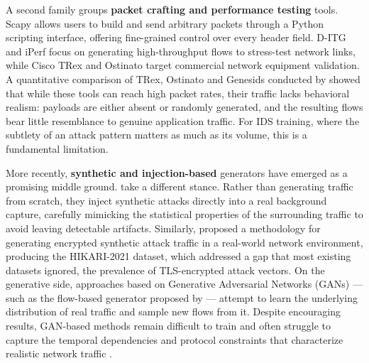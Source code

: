\documentclass[conference]{IEEEtran}
\begin{document}
A second family groups \textbf{packet crafting and performance testing}
tools. Scapy allows users to build and send arbitrary packets through
a Python scripting interface, offering fine-grained control over every
header field. D-ITG and iPerf focus on generating high-throughput flows
to stress-test network links, while Cisco TRex and Ostinato target
commercial network equipment validation. A quantitative comparison of
TRex, Ostinato and Genesids conducted by \textcite{koay2021} showed
that while these tools can reach high packet rates, their traffic lacks
behavioral realism: payloads are either absent or randomly generated,
and the resulting flows bear little resemblance to genuine application
traffic. For IDS training, where the subtlety of an attack pattern
matters as much as its volume, this is a fundamental limitation.

More recently, \textbf{synthetic and injection-based} generators have
emerged as a promising middle ground. \textcite{id2t2021} take a
different stance. Rather than generating traffic from scratch, they
inject synthetic attacks directly into a real background capture,
carefully mimicking the statistical properties of the surrounding
traffic to avoid leaving detectable artifacts. Similarly,
\textcite{hikari2021} proposed a methodology for generating encrypted
synthetic attack traffic in a real-world network environment, producing
the HIKARI-2021 dataset, which addressed a gap that most existing
datasets ignored, the prevalence of TLS-encrypted attack vectors. On
the generative side, approaches based on Generative Adversarial Networks
(GANs) --- such as the flow-based generator proposed by
\textcite{ring2019gan} --- attempt to learn the underlying distribution
of real traffic and sample new flows from it. Despite encouraging
results, GAN-based methods remain difficult to train and often struggle
to capture the temporal dependencies and protocol constraints that
characterize realistic network traffic \cite{adeleke2022}.
\end{document}
